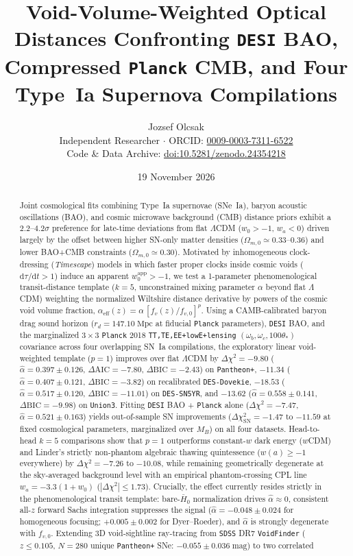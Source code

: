 \documentclass[11pt,a4paper]{article}
\title{Void-Volume-Weighted Optical Distances Confronting \texttt{DESI} BAO, Compressed \texttt{Planck} CMB, and Four Type~Ia Supernova Compilations}
\author{Jozsef Olcsak\\[0.25em]
\small Independent Researcher $\cdot$ ORCID: \href{https://orcid.org/0009-0003-7311-6522}{0009-0003-7311-6522}\\
\small Code \& Data Archive: \href{https://doi.org/10.5281/zenodo.24354218}{doi:10.5281/zenodo.24354218}}
\date{19 November 2026}
\begin{document}
\maketitle

\begin{abstract}
\noindent Joint cosmological fits combining Type~Ia supernovae (SNe~Ia), baryon acoustic oscillations (BAO), and cosmic microwave background (CMB) distance priors exhibit a $2.2\text{--}4.2\sigma$ preference for late-time deviations from flat $\Lambda$CDM ($w_0 > -1$, $w_a < 0$) driven largely by the offset between higher SN-only matter densities ($\Omega_{m,0} \simeq 0.33\text{--}0.36$) and lower BAO+CMB constraints ($\Omega_{m,0} \simeq 0.30$). Motivated by inhomogeneous clock-dressing (\textit{Timescape}) models in which faster proper clocks inside cosmic voids ($\mathrm{d}\tau/\mathrm{d}t > 1$) induce an apparent $w_0^{\mathrm{app}} > -1$, we test a 1-parameter phenomenological transit-distance template ($k = 5$, unconstrained mixing parameter $\alpha$ beyond flat $\Lambda$CDM) weighting the normalized Wiltshire distance derivative by powers of the cosmic void volume fraction, $\alpha_{\mathrm{eff}}(z) = \alpha\,[f_v(z)/f_{v,0}]^p$. Using a CAMB-calibrated baryon drag sound horizon ($r_d = 147.10\;\mathrm{Mpc}$ at fiducial \texttt{Planck} parameters), \texttt{DESI} BAO, and the marginalized $3\times 3$ \texttt{Planck} 2018 \texttt{TT,TE,EE+lowE+lensing} $(\omega_b, \omega_c, 100\theta_*)$ covariance across four overlapping SN~Ia compilations, the exploratory linear void-weighted template ($p = 1$) improves over flat $\Lambda$CDM by $\Delta\chi^2 = -9.80$ ($\hat{\alpha} = 0.397 \pm 0.126$, $\Delta\mathrm{AIC} = -7.80$, $\Delta\mathrm{BIC} = -2.43$) on \texttt{Pantheon+}, $-11.34$ ($\hat{\alpha} = 0.407 \pm 0.121$, $\Delta\mathrm{BIC} = -3.82$) on recalibrated \texttt{DES-Dovekie}, $-18.53$ ($\hat{\alpha} = 0.517 \pm 0.120$, $\Delta\mathrm{BIC} = -11.01$) on \texttt{DES-SN5YR}, and $-13.62$ ($\hat{\alpha} = 0.558 \pm 0.141$, $\Delta\mathrm{BIC} = -9.98$) on \texttt{Union3}. Fitting \texttt{DESI} BAO + \texttt{Planck} alone ($\Delta\chi^2 = -7.47$, $\hat{\alpha} = 0.521 \pm 0.163$) yields out-of-sample SN improvements ($\Delta\chi^2_{\mathrm{SN}} = -1.47$ to $-11.59$ at fixed cosmological parameters, marginalized over $M_B$) on all four datasets. Head-to-head $k = 5$ comparisons show that $p = 1$ outperforms constant-$w$ dark energy ($w$CDM) and Linder's strictly non-phantom algebraic thawing quintessence ($w(a) \ge -1$ everywhere) by $\Delta\chi^2 = -7.26$ to $-10.08$, while remaining geometrically degenerate at the sky-averaged background level with an empirical phantom-crossing CPL line $w_a = -3.3(1+w_0)$ ($|\Delta\chi^2| \le 1.73$). Crucially, the effect currently resides strictly in the phenomenological transit template: bare-$\bar{H}_0$ normalization drives $\hat{\alpha} \approx 0$, consistent all-$z$ forward Sachs integration suppresses the signal ($\hat{\alpha} = -0.048 \pm 0.024$ for homogeneous focusing; $+0.005 \pm 0.002$ for Dyer--Roeder), and $\hat{\alpha}$ is strongly degenerate with $f_{v,0}$. Extending 3D void-sightline ray-tracing from \texttt{SDSS} DR7 \texttt{VoidFinder} ($z \le 0.105$, $N = 280$ unique \texttt{Pantheon+} SNe: $-0.055 \pm 0.036\;\mathrm{mag}$) to two correlated 
\end{abstract}
\end{document}
